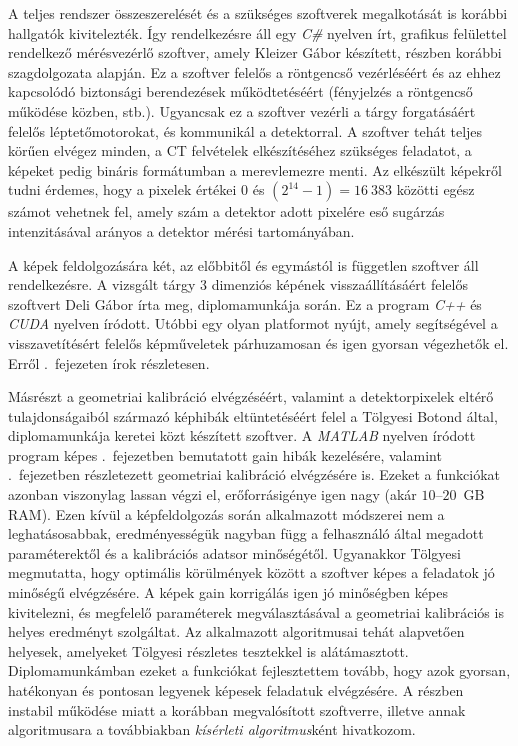 \documentclass[a4paper,12pt]{article}
\begin{document}
A teljes rendszer összeszerelését és a szükséges szoftverek megalkotását is  korábbi hallgatók kivitelezték. Így rendelkezésre áll egy \emph{C\#} nyelven írt, grafikus felülettel rendelkező mérésvezérlő szoftver, amely Kleizer Gábor készített, részben korábbi szagdolgozata \cite{kleizer} alapján. Ez a szoftver felelős a röntgencső vezérléséért és az ehhez kapcsolódó biztonsági berendezések működtetéséért (fényjelzés a röntgencső működése közben, stb.). Ugyancsak ez a szoftver vezérli a tárgy forgatásáért felelős léptetőmotorokat, és kommunikál a detektorral. A szoftver tehát teljes körűen elvégez minden, a CT felvételek elkészítéséhez szükséges feladatot, a képeket pedig bináris formátumban a merevlemezre menti. Az elkészült képekről tudni érdemes, hogy a pixelek értékei $0$ és $  \left ( 2^{14}-1 \right ) = 16~383$ közötti egész számot vehetnek fel, amely szám a detektor adott pixelére eső sugárzás intenzitásával arányos a detektor mérési tartományában.


A képek feldolgozására két, az előbbitől és egymástól is független szoftver áll rendelkezésre. A vizsgált tárgy 3 dimenziós képének visszaállításáért felelős szoftvert Deli Gábor \cite{deli} írta meg, diplomamunkája során. Ez a program \emph{C++} és \emph{CUDA} nyelven íródott. Utóbbi egy olyan platformot nyújt, amely segítségével a visszavetítésért felelős képműveletek párhuzamosan és igen gyorsan végezhetők el. Erről  .~fejezeten írok részletesen. 


Másrészt a geometriai kalibráció elvégzéséért, valamint a detektorpixelek eltérő tulajdonságaiból származó képhibák eltüntetéséért felel a Tölgyesi Botond által, diplomamunkája  \cite{botond} keretei közt készített szoftver. A \emph{MATLAB} nyelven íródott program  képes .~fejezetben bemutatott gain hibák kezelésére, valamint  .~fejezetben részletezett geometriai kalibráció elvégzésére is. Ezeket a funkciókat azonban viszonylag lassan végzi el, erőforrásigénye igen nagy (akár $10$--$20$~GB RAM). Ezen kívül a képfeldolgozás során alkalmazott módszerei nem a leghatásosabbak, eredményességük nagyban függ  a felhasználó által megadott paraméterektől és a kalibrációs adatsor minőségétől. Ugyanakkor Tölgyesi megmutatta, hogy optimális körülmények között a szoftver képes a feladatok jó minőségű elvégzésére. A képek gain korrigálás igen jó minőségben képes kivitelezni, és megfelelő paraméterek megválasztásával a geometriai kalibrációs is helyes eredményt szolgáltat. Az alkalmazott algoritmusai tehát alapvetően helyesek, amelyeket Tölgyesi részletes tesztekkel is alátámasztott. Diplomamunkámban ezeket a  funkciókat fejlesztettem tovább,  hogy azok gyorsan, hatékonyan  és pontosan legyenek képesek feladatuk elvégzésére. A részben instabil működése miatt  a korábban  megvalósított szoftverre, illetve annak algoritmusara a továbbiakban \emph{kísérleti algoritmus}ként hivatkozom.
\end{document}
